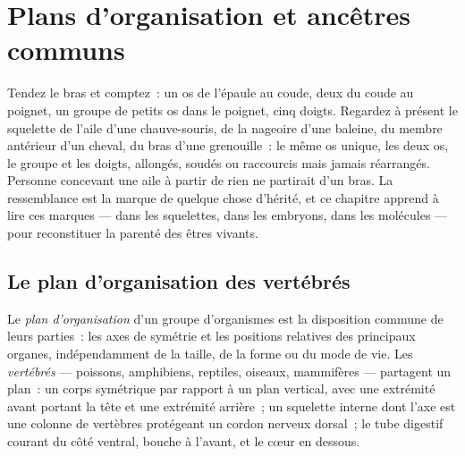 \chapter{Plans d'organisation et ancêtres communs}\label{ch:g10:common-ancestry}

Tendez le bras et comptez~: un os de l'épaule au coude, deux du coude
au poignet, un groupe de petits os dans le poignet, cinq doigts.
Regardez à présent le squelette de l'aile d'une chauve-souris, de la
nageoire d'une baleine, du membre antérieur d'un cheval, du bras d'une
grenouille~: le même os unique, les deux os, le groupe et les doigts,
allongés, soudés ou raccourcis mais jamais réarrangés. Personne
concevant une aile à partir de rien ne partirait d'un bras. La
ressemblance est la marque de quelque chose d'hérité, et ce chapitre
apprend à lire ces marques --- dans les squelettes, dans les embryons,
dans les molécules --- pour reconstituer la parenté des êtres vivants.

\section{Le plan d'organisation des vertébrés}

\begin{definition}\label{def:g10:common-ancestry:bodyplan}
Le \emph{plan d'organisation} d'un groupe
d'organismes est la disposition commune de leurs parties~: les axes de
symétrie et les positions relatives des principaux organes,
indépendamment de la taille, de la forme ou du mode de vie. Les
\emph{vertébrés} --- poissons, amphibiens, reptiles,
oiseaux, mammifères --- partagent un plan~: un corps symétrique par
rapport à un plan vertical, avec une extrémité avant portant la tête et
une extrémité arrière~; un squelette interne dont l'axe est une colonne
de vertèbres protégeant un cordon nerveux dorsal~; le tube digestif
courant du côté ventral, bouche à l'avant, et le cœur en dessous.
\end{definition}

